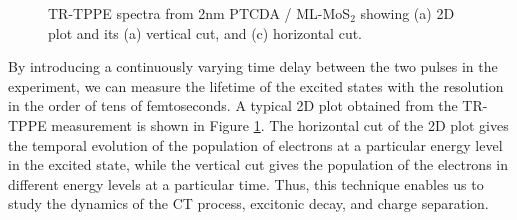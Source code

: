 \documentclass[12pt]{article}
\begin{document}
\begin{figure}[H]
\centering
{}\vspace{0.5cm}
 \hspace{0.3cm}

\caption{TR-TPPE spectra from 2nm PTCDA / ML-MoS$_2$ showing (a) 2D plot and its (a) vertical cut, and (c) horizontal cut.}\label{fig:TPPE 2D}
\end{figure}

By introducing a continuously varying time delay between the two pulses in the experiment, we can measure the lifetime of the excited states with the resolution in the order of tens of femtoseconds. A typical 2D plot obtained from the TR-TPPE measurement is shown in Figure \ref{fig:TPPE 2D}. The horizontal cut of the 2D plot gives the temporal evolution of the population of electrons at a particular energy level in the excited state, while the vertical cut gives the population of the electrons in different energy levels at a particular time. Thus, this technique enables us to study the dynamics of the CT process, excitonic decay, and charge separation.
\end{document}
